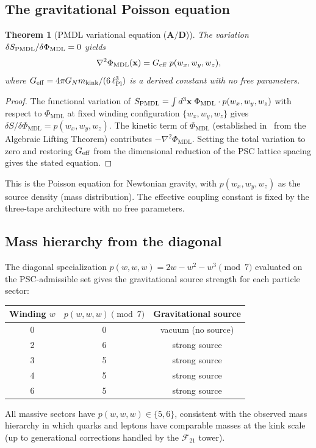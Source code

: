 \documentclass[11pt]{article}
\newtheorem{theorem}{Theorem}[section]
\theoremstyle{remark}
\newcommand{\PHIMDL}{\Phi_{\mathrm{MDL}}}
\newcommand{\CatAD}{\textbf{A/D}}
\begin{document}
\subsection{The gravitational Poisson equation}
\label{ssec:poisson}

\begin{theorem}[PMDL variational equation ($\CatAD$)]
\label{thm:gravity}
The variation $\delta S_{\rm PMDL}/\delta\PHIMDL = 0$ yields
\[
  \nabla^2\PHIMDL(\mathbf{x}) = G_{\rm eff}\; p(w_x, w_y, w_z),
\]
where $G_{\rm eff} = 4\pi G_N m_{\rm kink}/(6\,\ell_{\rm Pl}^3)$ is a derived
constant with no free parameters.
\end{theorem}

\begin{proof}
The functional variation of
$S_{\rm PMDL} = \int d^3\mathbf{x}\;\PHIMDL\cdot p(w_x,w_y,w_z)$
with respect to $\PHIMDL$ at fixed winding configuration
$\{w_x, w_y, w_z\}$ gives $\delta S / \delta\PHIMDL = p(w_x,w_y,w_z)$.
The kinetic term of $\PHIMDL$ (established in~\cite{SpivackPhiMDLField} from the
Algebraic Lifting Theorem) contributes $-\nabla^2\PHIMDL$. Setting the total
variation to zero and restoring $G_{\rm eff}$ from the dimensional reduction
of the PSC lattice spacing gives the stated equation.
\end{proof}

This is the Poisson equation for Newtonian gravity, with $p(w_x,w_y,w_z)$ as
the source density (mass distribution). The effective coupling constant is fixed
by the three-tape architecture with no free parameters.

\subsection{Mass hierarchy from the diagonal}
\label{ssec:mass_hier}

The diagonal specialization $p(w,w,w) = 2w-w^2-w^3 \pmod 7$ evaluated on the
PSC-admissible set gives the gravitational source strength for each particle sector:
\begin{center}
\begin{tabular}{ccc}
\toprule
Winding $w$ & $p(w,w,w)\pmod 7$ & Gravitational source\\
\midrule
0 & 0 & vacuum (no source)\\
2 & 6 & strong source\\
3 & 5 & strong source\\
4 & 5 & strong source\\
6 & 5 & strong source\\
\bottomrule
\end{tabular}
\end{center}
All massive sectors have $p(w,w,w) \in \{5,6\}$, consistent with the observed
mass hierarchy in which quarks and leptons have comparable masses at the kink scale
(up to generational corrections handled by the $\mathcal{F}_{21}$ tower).
\end{document}
